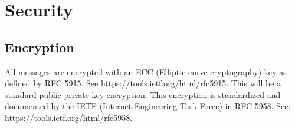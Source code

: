 \section{Security}
\subsection{Encryption}
All messages are encrypted with an ECC (Elliptic curve cryptography) key as defined by RFC 5915. See \url{https://tools.ietf.org/html/rfc5915}. This will be a standard public-private key encryption. This encryption is standardized and documented by the IETF (Internet Engineering Task Force) in RFC 5958. See: \url{https://tools.ietf.org/html/rfc5958}.